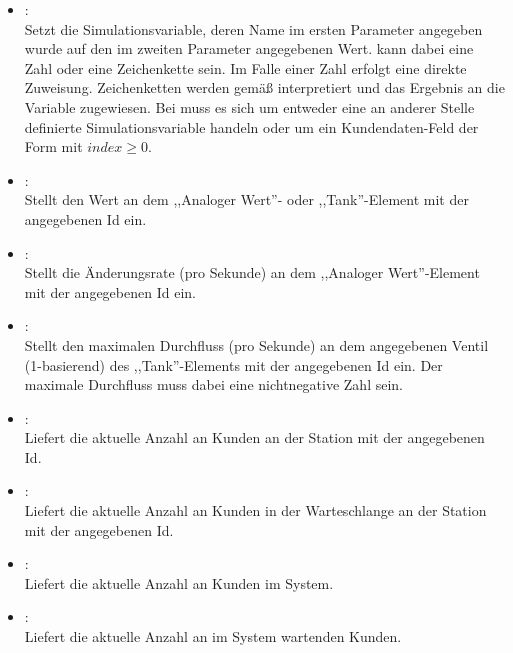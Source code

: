 \begin{itemize}

\item
{}:\\
Setzt die Simulationsvariable, deren Name im ersten Parameter angegeben wurde auf den im zweiten Parameter angegebenen Wert.
 kann dabei eine Zahl oder eine Zeichenkette sein. Im Falle einer Zahl erfolgt eine direkte Zuweisung.
Zeichenketten werden gemäß  interpretiert und das Ergebnis an die Variable zugewiesen. Bei 
muss es sich um entweder eine an anderer Stelle definierte Simulationsvariable handeln oder um ein Kundendaten-Feld der Form
 mit $index\ge0$. 
  
\item
{}:\\
Stellt den Wert an dem ,,Analoger Wert''- oder ,,Tank''-Element mit der angegebenen Id ein.
  
\item
{}:\\
Stellt die Änderungsrate (pro Sekunde) an dem ,,Analoger Wert''-Element mit der angegebenen Id ein.
  
\item
{}:\\
Stellt den maximalen Durchfluss (pro Sekunde) an dem angegebenen Ventil (1-basierend) des ,,Tank''-Elements mit der angegebenen Id ein.
Der maximale Durchfluss muss dabei eine nichtnegative Zahl sein. 
  
\item
{}:\\
Liefert die aktuelle Anzahl an Kunden an der Station mit der angegebenen Id.
  
\item
{}:\\
Liefert die aktuelle Anzahl an Kunden in der Warteschlange an der Station mit der angegebenen Id.

\item
{}:\\
Liefert die aktuelle Anzahl an Kunden im System.
  
\item
{}:\\
Liefert die aktuelle Anzahl an im System wartenden Kunden.

\end{itemize}

